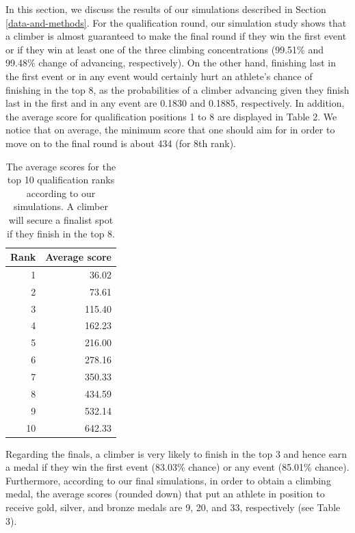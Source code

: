 \documentclass[12pt]{article}
\begin{document}
In this section, we discuss the results of our simulations described in
Section \ref{data-and-methods}. For the qualification round, our
simulation study shows that a climber is almost guaranteed to make the
final round if they win the first event or if they win at least one of
the three climbing concentrations (99.51\% and 99.48\% change of
advancing, respectively). On the other hand, finishing last in the first
event or in any event would certainly hurt an athlete's chance of
finishing in the top 8, as the probabilities of a climber advancing
given they finish last in the first and in any event are 0.1830 and
0.1885, respectively. In addition, the average score for qualification
positions 1 to 8 are displayed in Table 2. We notice that on average,
the minimum score that one should aim for in order to move on to the
final round is about 434 (for 8th rank).

\begin{table}[ht]
\centering
\caption{The average scores for the top 10 qualification ranks according to our simulations. A climber will secure a finalist spot if they finish in the top 8.} 
\begin{tabular}{rr}
  \hline
Rank & Average score \\ 
  \hline
  1 & 36.02 \\ 
    2 & 73.61 \\ 
    3 & 115.40 \\ 
    4 & 162.23 \\ 
    5 & 216.00 \\ 
    6 & 278.16 \\ 
    7 & 350.33 \\ 
    8 & 434.59 \\ 
    9 & 532.14 \\ 
   10 & 642.33 \\ 
   \hline
\end{tabular}
\end{table}

Regarding the finals, a climber is very likely to finish in the top 3
and hence earn a medal if they win the first event (83.03\% chance) or
any event (85.01\% chance). Furthermore, according to our final
simulations, in order to obtain a climbing medal, the average scores
(rounded down) that put an athlete in position to receive gold, silver,
and bronze medals are 9, 20, and 33, respectively (see Table 3).
\end{document}
